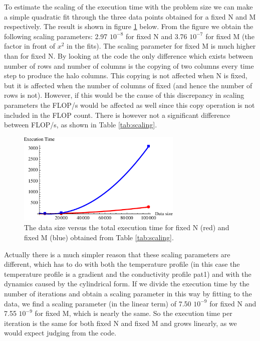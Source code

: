 \documentclass[11pt,a4paper,onecolumn]{article}
\begin{document}
To estimate the scaling of the execution time with the problem size we can make a simple quadratic fit through the three data points obtained for a fixed N and M respectively. The result is shown in figure \ref{fig:scaling} below. From the figure we obtain the following scaling parameters: 2.97 $10^{-8}$ for fixed N and 3.76 $10^{-7}$ for fixed M (the factor in front of $x^2$ in the fits). The scaling parameter for fixed M is much higher than for fixed N. By looking at the code the only difference which exists between number of rows and number of columns is the copying of two columns every time step to produce the halo columns. This copying is not affected when N is fixed, but it is affected when the number of columns of fixed (and hence the number of rows is not). However, if this would be the cause of this discrepancy in scaling parameters the FLOP/s would be affected as well since this copy operation is not included in the FLOP count. There is however not a significant difference between FLOP/s, as shown in Table \ref{tab:scaling}.

\begin{figure}[H]
  \centering
  \includegraphics[width=0.7\textwidth]{scaling.pdf}
  \caption{The data size versus the total execution time for fixed N (red) and fixed M (blue) obtained from Table \ref{tab:scaling}.}
  \label{fig:scaling}
\end{figure}

Actually there is a much simpler reason that these scaling parameters are different, which has to do with both the temperature profile (in this case the temperature profile is a gradient and the conductivity profile pat1) and with the dynamics caused by the cylindrical form. If we divide the execution time by the number of iterations and obtain a scaling parameter in this way by fitting to the data, we find a scaling parameter (in the linear term) of 7.50 $10^{-9}$ for fixed N and 7.55 $10^{-9}$ for fixed M, which is nearly the same. So the execution time per iteration is the same for both fixed N and fixed M and grows linearly, as we would expect judging from the code. 
\end{document}
